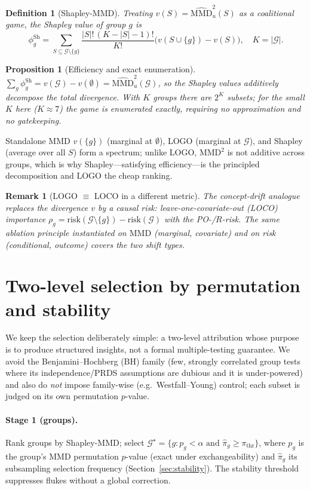 \documentclass[11pt]{article}
\newtheorem{definition}{Definition}
\newtheorem{proposition}{Proposition}
\newtheorem{remark}{Remark}
\newcommand{\Gcal}{\mathcal{G}}
\newcommand{\MMD}{\mathrm{MMD}}
\begin{document}
\begin{definition}[Shapley-MMD]
Treating $v(S)=\widehat{\MMD}^2_u(S)$ as a coalitional game, the Shapley value of
group $g$ is
\begin{equation}
\phi^{\mathrm{Sh}}_g=\sum_{S\subseteq\Gcal\setminus\{g\}}
\frac{|S|!\,(K-|S|-1)!}{K!}\bigl(v(S\cup\{g\})-v(S)\bigr),\quad K=|\Gcal|.
\end{equation}
\end{definition}

\begin{proposition}[Efficiency and exact enumeration]
$\sum_{g}\phi^{\mathrm{Sh}}_g=v(\Gcal)-v(\emptyset)=\widehat{\MMD}^2_u(\Gcal)$,
so the Shapley values additively decompose the total divergence. With
$K$ groups there are $2^{K}$ subsets; for the small $K$ here ($K\!\approx\!7$)
the game is enumerated exactly, requiring no approximation and no gatekeeping.
\end{proposition}
Standalone MMD $v(\{g\})$ (marginal at $\emptyset$), LOGO (marginal at
$\Gcal$), and Shapley (average over all $S$) form a spectrum; unlike LOGO,
$\MMD^2$ is not additive across groups, which is why Shapley---satisfying
efficiency---is the principled decomposition and LOGO the cheap ranking.

\begin{remark}[LOGO $\equiv$ LOCO in a different metric]
The concept-drift analogue replaces the divergence $v$ by a causal risk:
leave-one-covariate-out (LOCO) importance
$\rho_g=\text{risk}(\Gcal\setminus\{g\})-\text{risk}(\Gcal)$ with the PO-/$R$-risk.
The same ablation principle instantiated on $\MMD$ (marginal, covariate) and on
risk (conditional, outcome) covers the two shift types.
\end{remark}

\section{Two-level selection by permutation and stability}

We keep the selection deliberately simple: a two-level attribution whose purpose
is to produce structured insights, not a formal multiple-testing guarantee. We
avoid the Benjamini--Hochberg (BH) family (few, strongly correlated group tests
where its independence/PRDS assumptions are dubious and it is under-powered) and
also do \emph{not} impose family-wise (e.g.\ Westfall--Young) control; each
subset is judged on its own permutation $p$-value.

\paragraph{Stage 1 (groups).} Rank groups by Shapley-MMD; select
$\Gcal^\star=\{g: p_g<\alpha \text{ and } \hat\pi_g\ge\pi_{\mathrm{thr}}\}$,
where $p_g$ is the group's MMD permutation $p$-value (exact under exchangeability)
and $\hat\pi_g$ its subsampling selection frequency (Section~\ref{sec:stability}).
The stability threshold suppresses flukes without a global correction.
\end{document}
